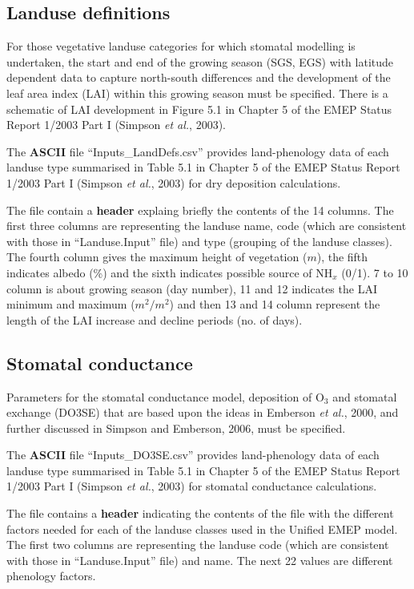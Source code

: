 \subsection{Landuse definitions}
For those vegetative landuse categories for which stomatal modelling is
undertaken, the start and end of the growing season (SGS, EGS) with
latitude dependent data to capture north-south differences and the
development of the leaf area index (LAI) within this growing season
must be specified. There is a schematic of LAI development in Figure
5.1 in Chapter 5 of the EMEP Status Report 1/2003 Part I (Simpson {\sl et al.}, 2003).

The {\bf ASCII} file ``Inputs\_LandDefs.csv'' provides land-phenology data
of each landuse type summarised in Table 5.1 in Chapter 5 of the EMEP 
Status Report 1/2003 Part I (Simpson {\sl et al.}, 2003) for dry deposition 
calculations.

The file contain a {\bf header} explaing briefly the contents of the 
14 columns. 
The first three columns are representing the landuse name, code (which
are consistent with those in ``Landuse.Input'' file) and
type (grouping of the landuse classes). The fourth column gives
the maximum height of vegetation ($m$), the fifth indicates albedo (\%) and
the sixth indicates possible source of NH$_{x}$ (0/1). 7 to 10
column is about growing season (day number), 11 and 12 indicates the
LAI minimum  and maximum ($m^{2}/m^{2}$) and then 13 and 14 column
represent the length of the LAI increase and decline periods (no. of days).


\subsection{Stomatal conductance}
Parameters for the stomatal conductance model, deposition of O$_{3}$ and
stomatal exchange (DO3SE) that are based upon the ideas in
Emberson {\sl et al.}, 2000, and further discussed in Simpson and Emberson,
2006, must be specified.  

The {\bf ASCII} file ``Inputs\_DO3SE.csv'' provides land-phenology data
of each landuse type summarised in Table 5.1 in Chapter 5 of the EMEP 
Status Report 1/2003 Part I (Simpson {\sl et al.}, 2003) for stomatal
conductance calculations.

The file contains a {\bf header} indicating the contents of the file
with the different factors needed for each of the landuse classes used
in the Unified EMEP model. The first two columns are representing the
landuse code (which are consistent with those in ``Landuse.Input'' file)
and name. The next 22 values are different phenology factors.

